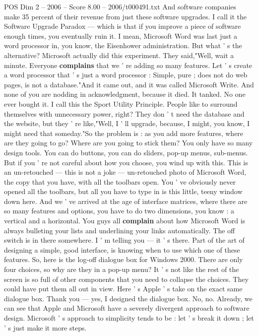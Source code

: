 \begin{textsample}{POS Dim 2 – 2006 – Score 8.00 – 2006/t000491.txt}
And software companies make 35 percent of their revenue from just these software upgrades.
I call it the Software Upgrade Paradox — which is that if you improve a piece of software enough times, you eventually ruin it.
I mean, Microsoft Word was last just a word processor in, you know, the Eisenhower administration.
But what ' s the alternative?
Microsoft actually did this experiment.
They said,"Well, wait a minute.
Everyone \textbf{complains} that we ' re adding so many features.
Let ' s create a word processor that ' s just a word processor : Simple, pure ; does not do web pages, is not a database."And it came out, and it was called Microsoft Write.
And none of you are nodding in acknowledgment, because it died.
It tanked.
No one ever bought it.
I call this the Sport Utility Principle.
People like to surround themselves with unnecessary power, right?
They don ' t need the database and the website, but they ' re like,"Well, I ' ll upgrade, because, I might, you know, I might need that someday."So the problem is : as you add more features, where are they going to go?
Where are you going to stick them?
You only have so many design tools.
You can do buttons, you can do sliders, pop-up menus, sub-menus.
But if you ' re not careful about how you choose, you wind up with this.
This is an un-retouched — this is not a joke — un-retouched photo of Microsoft Word, the copy that you have, with all the toolbars open.
You ' ve obviously never opened all the toolbars, but all you have to type in is this little, teeny window down here.
And we ' ve arrived at the age of interface matrices, where there are so many features and options, you have to do two dimensions, you know : a vertical and a horizontal.
You guys all \textbf{complain} about how Microsoft Word is always bulleting your lists and underlining your links automatically.
The off switch is in there somewhere.
I ' m telling you — it ' s there.
Part of the art of designing a simple, good interface, is knowing when to use which one of these features.
So, here is the log-off dialogue box for Windows 2000.
There are only four choices, so why are they in a pop-up menu?
It ' s not like the rest of the screen is so full of other components that you need to collapse the choices.
They could have put them all out in view.
Here ' s Apple ' s take on the exact same dialogue box.
Thank you — yes, I designed the dialogue box.
No, no.
Already, we can see that Apple and Microsoft have a severely divergent approach to software design.
Microsoft ' s approach to simplicity tends to be : let ' s break it down ; let ' s just make it more steps.

\end{textsample}
